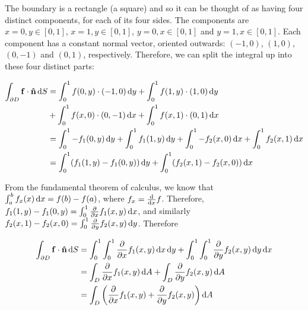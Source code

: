 
The boundary is a rectangle (a square) and so it can be thought of as having four distinct components, for each of its four sides. The components are $x = 0, y \in [0, 1]$, $x = 1, y \in [0, 1]$, $y = 0, x \in [0, 1]$ and $y = 1, x \in [0, 1]$. Each component has a constant normal vector, oriented outwards: $(-1, 0)$, $(1, 0)$, $(0, -1)$ and $(0, 1)$, respectively. Therefore, we can split the integral up into these four distinct parts:

\begin{align*}
  \int_{\partial D} \mathbf{f} \cdot \mathbf{\hat{n}} \diff S &= \int_0^1 f(0, y) \cdot (-1, 0) \diff y + \int_0^1 f(1, y) \cdot (1, 0) \diff y \\
  &+ \int_0^1 f(x, 0) \cdot (0, -1) \diff x + \int_0^1 f(x, 1) \cdot (0, 1) \diff x \\
  &= \int_0^1 -f_1(0, y) \diff y + \int_0^1 f_1(1, y) \diff y + \int_0^1 -f_2(x, 0) \diff x + \int_0^1 f_2(x, 1) \diff x \\
  &= \int_0^1 (f_1(1, y) - f_1(0, y)) \diff y + \int_0^1 (f_2(x, 1) - f_2(x, 0)) \diff x
\end{align*}

From the fundamental theorem of calculus, we know that $\int_a^b f_x(x) \mathop{}\!\mathrm{d} x = f(b) - f(a)$, where $f_x = \frac{\mathop{}\!\mathrm{d}}{\mathop{}\!\mathrm{d} x}f$. Therefore, $f_1(1, y) - f_1(0, y) = \int_0^1 \frac{\partial}{\partial x} f_1(x, y) \mathop{}\!\mathrm{d} x$, and similarly $f_2(x, 1) - f_2(x, 0) = \int_0^1 \frac{\partial}{\partial y} f_2(x, y) \mathop{}\!\mathrm{d} y$. Therefore

\begin{align*}
  \int_{\partial D} \mathbf{f} \cdot \mathbf{\hat{n}} \diff S &= \int_0^1 \int_0^1 \frac{\partial}{\partial x} f_1(x, y) \diff x \diff y + \int_0^1 \int_0^1 \frac{\partial}{\partial y} f_2(x, y) \diff y \diff x \\
  &= \int_D \frac{\partial}{\partial x} f_1(x, y) \diff A + \int_D \frac{\partial}{\partial y} f_2(x, y) \diff A \\
  &= \int_D \left(\frac{\partial}{\partial x} f_1(x, y) + \frac{\partial}{\partial y} f_2(x, y)\right) \diff A
\end{align*}


